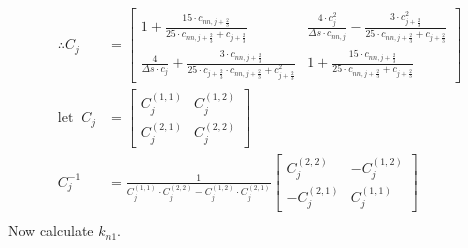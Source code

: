 \documentclass{article}
\begin{document}
\begin{align*}
  \therefore C_j &= \begin{bmatrix} 1 + \frac{15\cdot c_{nn, j+\frac{2}{3}}}{25\cdot c_{nn, j+\frac{2}{3}} + c_{j+\frac{2}{3}}} & \frac{4\cdot c^2_j}{\Delta s\cdot c_{nn, j}} - \frac{3\cdot c^2_{j+\frac{2}{3}}}{25\cdot c_{nn, j+\frac{2}{3}} + c_{j+\frac{2}{3}}} \\ \frac{4}{\Delta s\cdot c_j} + \frac{3\cdot c_{nn, j+\frac{2}{3}}}{25\cdot c_{j+\frac{2}{3}}\cdot c_{nn, j+\frac{2}{3}} + c_{j+\frac{2}{3}}^2} & 1 + \frac{15\cdot c_{nn, j+\frac{2}{3}}}{25\cdot c_{nn, j+\frac{2}{3}} + c_{j+\frac{2}{3}}}\end{bmatrix}\\
  \mathrm{let\;\;}C_j &= \begin{bmatrix} C^{(1, 1)}_{j} & C^{(1, 2)}_{j} \\ C^{(2, 1)}_{j} & C^{(2, 2)}_{j} \end{bmatrix}\\
  C_j^{-1} &= \frac{1}{C^{(1, 1)}_{j}\cdot C^{(2, 2)}_{j} - C^{(1, 2)}_{j}\cdot C^{(2, 1)}_{j}}\begin{bmatrix} C^{(2, 2)}_{j} & -C^{(1, 2)}_{j} \\ -C^{(2, 1)}_{j} & C^{(1, 1)}_{j} \end{bmatrix}\\
\end{align*}
Now calculate $k_{n1}$.
\end{document}
